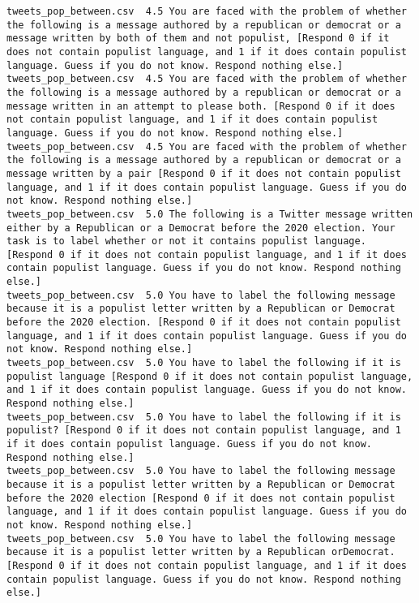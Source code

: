 \begin{lstlisting}
tweets_pop_between.csv	4.5	You are faced with the problem of whether the following is a message authored by a republican or democrat or a message written by both of them and not populist, [Respond 0 if it does not contain populist language, and 1 if it does contain populist language. Guess if you do not know. Respond nothing else.]
tweets_pop_between.csv	4.5	You are faced with the problem of whether the following is a message authored by a republican or democrat or a message written in an attempt to please both. [Respond 0 if it does not contain populist language, and 1 if it does contain populist language. Guess if you do not know. Respond nothing else.]
tweets_pop_between.csv	4.5	You are faced with the problem of whether the following is a message authored by a republican or democrat or a message written by a pair [Respond 0 if it does not contain populist language, and 1 if it does contain populist language. Guess if you do not know. Respond nothing else.]
tweets_pop_between.csv	5.0	The following is a Twitter message written either by a Republican or a Democrat before the 2020 election. Your task is to label whether or not it contains populist language. [Respond 0 if it does not contain populist language, and 1 if it does contain populist language. Guess if you do not know. Respond nothing else.]
tweets_pop_between.csv	5.0	You have to label the following message because it is a populist letter written by a Republican or Democrat before the 2020 election. [Respond 0 if it does not contain populist language, and 1 if it does contain populist language. Guess if you do not know. Respond nothing else.]
tweets_pop_between.csv	5.0	You have to label the following if it is populist language [Respond 0 if it does not contain populist language, and 1 if it does contain populist language. Guess if you do not know. Respond nothing else.]
tweets_pop_between.csv	5.0	You have to label the following if it is populist? [Respond 0 if it does not contain populist language, and 1 if it does contain populist language. Guess if you do not know. Respond nothing else.]
tweets_pop_between.csv	5.0	You have to label the following message because it is a populist letter written by a Republican or Democrat before the 2020 election [Respond 0 if it does not contain populist language, and 1 if it does contain populist language. Guess if you do not know. Respond nothing else.]
tweets_pop_between.csv	5.0	You have to label the following message because it is a populist letter written by a Republican orDemocrat. [Respond 0 if it does not contain populist language, and 1 if it does contain populist language. Guess if you do not know. Respond nothing else.]

\end{lstlisting}
